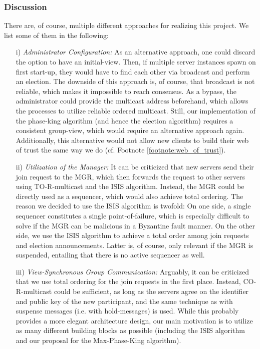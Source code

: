 \documentclass[runningheads]{llncs}
\begin{document}
\subsubsection{Discussion} 
There are, of course, multiple different approaches for realizing this project. We list some of them in the following:
\begin{enumerate}
    \item[i)] \textit{Administrator Configuration:} As an alternative approach, one could discard the option to have an initial-view. Then, if multiple server instances spawn on first start-up, they would have to find each other via broadcast and perform an election. The downside of this approach is, of course, that broadcast is not reliable, which makes it impossible to reach consensus. As a bypass, the administrator could provide the multicast address beforehand, which allows the processes to utilize reliable ordered multicast. Still, our implementation of the phase-king algorithm (and hence the election algorithm) requires a consistent group-view, which would require an alternative approach again. Additionally, this alternative would not allow new clients to build their web of trust the same way we do (cf. Footnote \ref{footnote:web_of_trust}). 
    \item[ii)] \textit{Utilization of the Manager:} It can be criticized that new servers send their join request to the MGR, which then forwards the request to other servers using TO-R-multicast and the ISIS algorithm. Instead, the MGR could be directly used as a sequencer, which would also achieve total ordering. The reason we decided to use the ISIS algorithm is twofold: On one side, a single sequencer constitutes a single point-of-failure, which is especially difficult to solve if the MGR can be malicious in a Byzantine fault manner. On the other side, we use the ISIS algorithm to achieve a total order among join requests and election announcements. Latter is, of course, only relevant if the MGR is suspended, entailing that there is no active sequencer as well. 
    \item[iii)] \textit{View-Synchronous Group Communication:} Arguably, it can be criticized that we use total ordering for the join requests in the first place. Instead, CO-R-multicast could be sufficient, as long as the servers agree on the identifier and public key of the new participant, and the same technique as with suspense messages (i.e. with hold-messages) is used. While this probably provides a more elegant architecture design, our main motivation is to utilize as many different building blocks as possible (including the ISIS algorithm and our proposal for the Max-Phase-King algorithm).
\end{enumerate}
\end{document}
